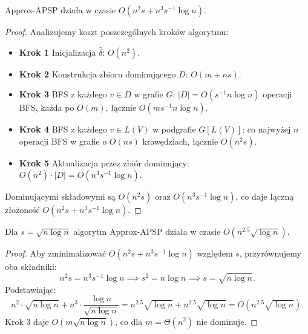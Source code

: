 \begin{twierdzenie}
Approx-APSP działa w czasie $O(n^2 s + n^3 s^{-1} \log n)$.
\end{twierdzenie}

\begin{proof}
Analizujemy koszt poszczególnych kroków algorytmu:
\begin{itemize}
  \item \textbf{Krok 1} Inicjalizacja $\hat{\delta}$: $O(n^2)$.
  \item \textbf{Krok 2} Konstrukcja zbioru dominującego $D$: $O(m + ns)$.
  \item \textbf{Krok 3} BFS z każdego $v \in D$ w grafie $G$: $|D| = O(s^{-1} n \log n)$ operacji BFS, każda po $O(m)$, łącznie $O(m s^{-1} n \log n)$.
  \item \textbf{Krok 4} BFS z każdego $v \in L(V)$ w podgrafie $G[L(V)]$: co najwyżej $n$ operacji BFS w grafie o $O(ns)$ krawędziach, łącznie $O(n^2 s)$.
  \item \textbf{Krok 5} Aktualizacja przez zbiór dominujący: $O(n^2) \cdot |D| = O(n^3 s^{-1} \log n)$.
\end{itemize}

Dominującymi składowymi są $O(n^2 s)$ oraz $O(n^3 s^{-1} \log n)$,
co daje łączną złożoność $O(n^2 s + n^3 s^{-1} \log n)$.
\end{proof}

\begin{wniosek}
Dla $s = \sqrt{n \log n}$ algorytm Approx-APSP działa w czasie
$O(n^{2{.}5}\sqrt{\log n})$.
\end{wniosek}

\begin{proof}
Aby zminimalizować $O(n^2 s + n^3 s^{-1} \log n)$ względem $s$,
przyrównujemy oba składniki:
\[
n^2 s = n^3 s^{-1} \log n
\implies s^2 = n \log n
\implies s = \sqrt{n \log n}.
\]
Podstawiając:
\[
n^2 \cdot \sqrt{n \log n} + n^3 \cdot \frac{\log n}{\sqrt{n \log n}}
= n^{2{.}5}\sqrt{\log n} + n^{2{.}5}\sqrt{\log n}
= O(n^{2{.}5}\sqrt{\log n}).
\]
Krok 3 daje $O(m\sqrt{n \log n})$, co dla $m = \Theta(n^2)$ nie dominuje.
\end{proof}
